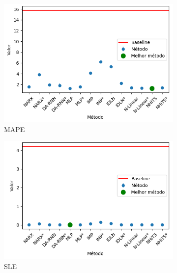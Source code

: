 \begin{figure}[htbp]
	\centering
	\begin{subfigure}[b]{0.3\textwidth}
		\centering
		\includegraphics[width=\textwidth]{figuras/mape_brasil_oil_results.png}
		\caption{\ac{MAPE}}
		\label{fig:mape_brasil_oil_results}
	\end{subfigure}
	\hfill
	\begin{subfigure}[b]{0.3\textwidth}
		\centering
		\includegraphics[width=\textwidth]{figuras/sle_brasil_oil_results.png}
		\caption{\ac{SLE}}
		\label{fig:sle_brasil_oil_results}
	\end{subfigure}
	\hfill
	\begin{subfigure}[b]{0.3\textwidth}
		\centering

\end{subfigure}
\end{figure}
